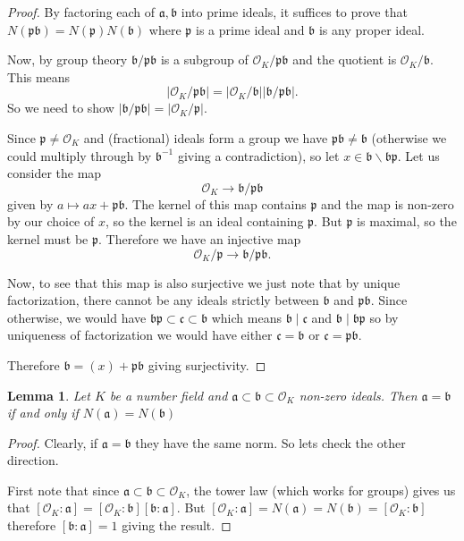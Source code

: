 \documentclass[11pt,a4paper]{report}
\theoremstyle{plain}
\newtheorem{lemma}[subsection]{Lemma}
\theoremstyle{definition}
\theoremstyle{definition}
\def\gothb{\mathfrak{b}}
\def\gothc{\mathfrak{c}}
\def\gothp{\mathfrak{p}}
\def \OO {\mathcal{O}}
\def\gotha{\mathfrak{a}}
\def \lra{\longrightarrow}
\begin{document}
	\begin{proof}
		By factoring each of $\gotha,\gothb$ into prime ideals, it suffices to prove that $N(\gothp\gothb)=N(\gothp)N(\gothb)$ where $\gothp$ is a prime ideal and $\gothb$ is any proper ideal.
		
		Now, by group theory $\gothb/\gothp\gothb$ is a subgroup of $\OO_K/\gothp\gothb$ and the quotient is $\OO_K/\gothb$. This means \[|\OO_K/\gothp\gothb|=|\OO_K/\gothb||\gothb/\gothp\gothb|.\] So we need to show $|\gothb/\gothp\gothb|=|\OO_K/\gothp|$.
		
		Since $\gothp \neq \OO_K$ and (fractional) ideals form a group we have $\gothp\gothb\neq \gothb$ (otherwise we could multiply through by $\gothb^{-1}$ giving a contradiction), so let $x \in \gothb \backslash \gothb\gothp$. Let us consider the map \[\OO_K \lra \gothb/\gothp\gothb\] given by $a \mapsto ax + \gothp\gothb$. The kernel of this map contains $\gothp$ and the map is non-zero by our choice of $x$, so the kernel is an ideal containing $\gothp$. But $\gothp$ is maximal, so the kernel must be $\gothp$. Therefore we have an injective map \[\OO_K/\gothp \lra \gothb/\gothp\gothb.\]
		
		Now, to see that this map is also surjective we just note that by unique factorization, there cannot be any ideals strictly between $\gothb$ and $\gothp\gothb$. Since otherwise, we would have $\gothb \gothp \subset \gothc \subset \gothb$ which means $\gothb \mid \gothc$ and $\gothb \mid \gothb \gothp$ so by uniqueness of factorization we would have either $\gothc=\gothb$ or $\gothc=\gothp \gothb$.
		
		Therefore $\gothb=(x)+\gothp\gothb$ giving surjectivity.
		
	\end{proof}
	
	\begin{lemma}\label{lem: containment of ideals equal if norm equal}
		Let $K$ be a number field and $\gotha \subset \gothb \subset \OO_K$ non-zero ideals. Then $\gotha=\gothb$ if and only if $N(\gotha)=N(\gothb)$
	\end{lemma}
	
	\begin{proof}
		Clearly, if $\gotha=\gothb$ they have the same norm. So lets check the other direction.	
		
		First note that since $\gotha \subset \gothb \subset \OO_K$, the tower law (which works for groups) gives us that $[\OO_K:\gotha]=[\OO_K:\gothb][\gothb:\gotha]$. But $[\OO_K:\gotha]=N(\gotha)=N(\gothb)=[\OO_K:\gothb]$ therefore $[\gothb:\gotha]=1$ giving the result.
		
		
	\end{proof}
	
\end{document}
